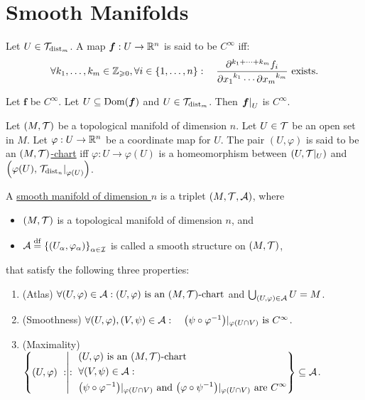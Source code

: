\documentclass[11pt,reqno]{amsart}
\renewcommand{\phi}{\varphi}
\begin{document}
\section{Smooth Manifolds}
\begin{Def}
Let $U\in\mathcal{T}_{\mathrm{dist}_m}$. A map $\bm f:U\to\mathbb{R}^n$ is said to be \ul{$C^\infty$} iff:
\[
\forall k_1,\ldots,k_m\in\Z_{\ge0},
\forall i\in\set{1,\ldots,n}:\quad
\frac{\partial^{k_1+\cdots+k_m}f_i}{{\partial x_1}^{k_1}\cdots{\partial x_m}^{k_m}}
~\text{exists}.
\]
\end{Def}
\begin{lemma}\label{lem:Cinfty-restriction}
Let $\bm f$ be $C^\infty$.
Let $U\subseteq\Dom{\bm f}$ and $U\in\mathcal{T}_{\mathrm{dist}_m}$.
Then $\eval{\bm f}_U$ is $C^\infty$.
\end{lemma}

\begin{Def}
Let $(M,\mathcal{T})$ be a topological manifold of dimension $n$.
Let $U\in\mathcal{T}$ be an open set in $M$. Let $\phi:U\to\R^n$ be a coordinate map for $U$.
The pair $(U,\phi)$ is said to be an \ul{$(M,\mathcal{T})$-chart} iff
$\phi:U\to\phi(U)$ is a homeomorphism between $(U,\mathcal{T}|_U)$
and $\Br{\phi(U),\eval{\T_{\dist_n}}_{\phi(U)}}$.
\end{Def}

\begin{Def}
A \ul{smooth manifold of dimension $n$} is a triplet $(M,\mathcal{T},\mathcal{A})$, where
\begin{itemize}
\item $(M,\mathcal{T})$ is a topological manifold of dimension $n$, and
\item $\A\df\set{(U_\alpha,\varphi_\alpha)}_{\alpha\in\I}$
is called a smooth structure on $(M,\mathcal{T})$,
\end{itemize}
that satisfy the following three properties:
\begin{enumerate}
\item (Atlas)\qquad
$\forall(U,\phi)\in\A:(U,\phi)~\text{is an $(M,\T)$-chart}$
\qquad and \qquad
$\bigcup_{(U,\phi)\in\A}U=M$.
\item (Smoothness)
$\forall(U,\phi),(V,\psi)\in\A:\quad
\Br{\psi\circ\phi\inv}|_{\phi(U\cap V)}
~\text{is $C^\infty$}$.
\item (Maximality)
$\set{(U,\phi)\st
\begin{aligned}
&(U,\phi)~\text{is an $(M,\T)$-chart}\\
&\forall(V,\psi)\in\A:\\
&\Br{\psi\circ\phi\inv}|_{\phi(U\cap V)}\tand
\Br{\phi\circ\psi\inv}|_{\phi(U\cap V)}
~\text{are $C^\infty$}
\end{aligned}
}
\subseteq\A
$.
\end{enumerate}
\end{Def}
\end{document}
